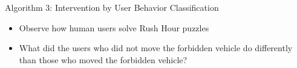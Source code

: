 \begin{frame}{Algorithm 3: Intervention by User Behavior Classification}
\begin{itemize}
\item Observe how human users solve Rush Hour puzzles
\item What did the users who did not move the forbidden vehicle do differently than those who moved the forbidden vehicle?
\end{itemize}
\end{frame}